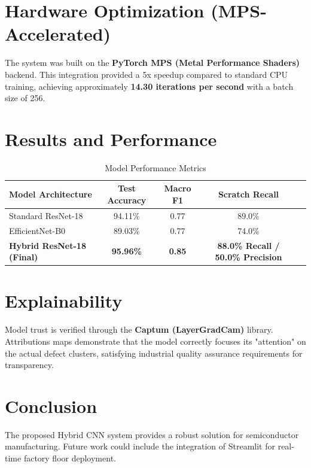 \documentclass[11pt,a4paper]{article}
\begin{document}
\section{Hardware Optimization (MPS-Accelerated)}
The system was built on the \textbf{PyTorch MPS (Metal Performance Shaders)} backend. This integration provided a 5x speedup compared to standard CPU training, achieving approximately \textbf{14.30 iterations per second} with a batch size of 256.

\section{Results and Performance}

\begin{table}[H]
\centering
\caption{Model Performance Metrics}
\begin{tabular}{lcccc}
\toprule
\textbf{Model Architecture} & \textbf{Test Accuracy} & \textbf{Macro F1} & \textbf{Scratch Recall} \\
\midrule
Standard ResNet-18 & 94.11\% & 0.77 & 89.0\% \\
EfficientNet-B0 & 89.03\% & 0.77 & 74.0\% \\
\textbf{Hybrid ResNet-18 (Final)} & \textbf{95.96\%} & \textbf{0.85} & \textbf{88.0\% Recall / 50.0\% Precision} \\
\bottomrule
\end{tabular}
\end{table}

\section{Explainability}
Model trust is verified through the \textbf{Captum (LayerGradCam)} library. Attributions maps demonstrate that the model correctly focuses its "attention" on the actual defect clusters, satisfying industrial quality assurance requirements for transparency.

\section{Conclusion}
The proposed Hybrid CNN system provides a robust solution for semiconductor manufacturing. Future work could include the integration of Streamlit for real-time factory floor deployment.
\end{document}
